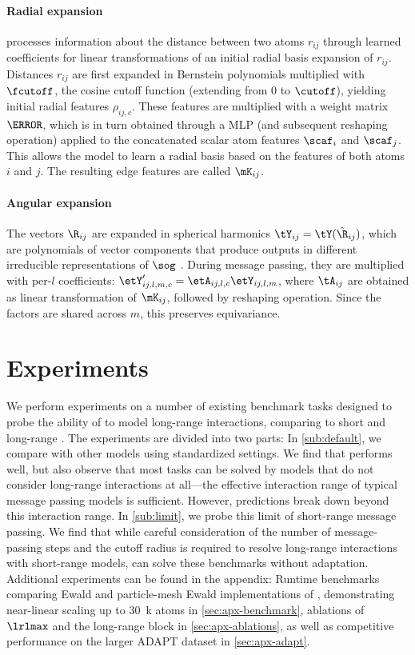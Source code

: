 \documentclass[10pt]{article}
\begin{document}
\paragraph{Radial expansion} \lorem processes information about the distance between two atoms $r_{ij}$ through learned coefficients for linear transformations of an initial radial basis expansion of $r_{ij}$. Distances $r_{ij}$ are first expanded in Bernstein polynomials multiplied with $\fcutoff$, the cosine cutoff function (extending from $0$ to $\cutoff$), yielding initial radial features $\rho_{ij,c}$. These features are multiplied with a weight matrix $\mA$, which is in turn obtained through a MLP (and subsequent reshaping operation) applied to the concatenated scalar atom features $\scaf_i$ and $\scaf_j$. This allows the model to learn a radial basis based on the features of both atoms $i$ and $j$. The resulting edge features are called $\mK_{ij}$.

\paragraph{Angular expansion} The vectors $\R_{ij}$ are expanded in spherical harmonics $\tY_{ij}=\tY(\hat{\R}_{ij})$, which are polynomials of vector components that produce outputs in different irreducible representations of $\sog$ \citep{um2024}. During message passing, they are multiplied with per-$l$ coefficients: $\etY'_{ij,l,m,c} = \etA_{ij,l,c} \etY_{ij,l,m}$, where $\tA_{ij}$ are obtained as linear transformation of $\mK_{ij}$, followed by reshaping operation. Since the factors are shared across $m$, this preserves equivariance.

\label{sec:model}

\section{Experiments}
\label{sec:experiments}

We perform experiments on a number of existing benchmark tasks designed to probe the ability of \mlps to model long-range interactions, comparing \lorem to short and long-range \mlps{}.
The experiments are divided into two parts: In \cref{sub:default}, we compare \lorem with other models using standardized settings. We find that \lorem{} performs well, but also observe that most tasks can be solved by models that do not consider long-range interactions at all---the effective interaction range of typical message passing models is sufficient. However, predictions break down beyond this interaction range.
In \cref{sub:limit}, we probe this limit of short-range message passing. We find that while careful consideration of the number of message-passing steps and the cutoff radius is required to resolve long-range interactions with short-range models, \lorem can solve these benchmarks without adaptation. Additional experiments can be found in the appendix: Runtime benchmarks comparing Ewald and particle-mesh Ewald implementations of \lorem, demonstrating near-linear scaling up to \qty{30}{k} atoms in \cref{sec:apx-benchmark}, ablations of $\lrlmax$ and the long-range block in \cref{sec:apx-ablations}, as well as competitive performance on the larger ADAPT dataset \citep{dxzhrjk2025pre} in \cref{sec:apx-adapt}.
\end{document}
